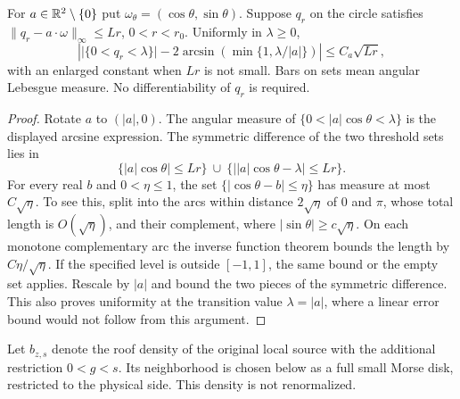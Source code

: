 \begin{lemma}
\label{lem:v65-angular-threshold}
For $a\in\mathbb R^2\setminus\{0\}$ put $\omega_\theta=(\cos\theta,\sin\theta)$.
Suppose $q_r$ on the circle satisfies
$\|q_r-a\cdot\omega\|_\infty\le Lr$, $0<r<r_0$.
Uniformly in $\lambda\ge0$,
\begin{equation}\label{eq:v65-angular-threshold}
 \left|\bigl|\{0<q_r<\lambda\}\bigr|
       -2\arcsin\!\left(\min\{1,\lambda/|a|\}\right)\right|
       \le C_a\sqrt{Lr},
\end{equation}
with an enlarged constant when $Lr$ is not small. Bars on sets mean
angular Lebesgue measure. No differentiability of $q_r$ is required.
\end{lemma}
\begin{proof}
Rotate $a$ to $(|a|,0)$. The angular measure of
$\{0<|a|\cos\theta<\lambda\}$ is the displayed arcsine expression.
The symmetric difference of the two threshold sets lies in
\[
 \{|a|\cos\theta|\le Lr\}\ \cup\
 \{\bigl||a|\cos\theta-\lambda\bigr|\le Lr\}.
\]
For every real $b$ and $0<\eta\le1$, the set
$\{|\cos\theta-b|\le\eta\}$ has measure at most $C\sqrt\eta$.
To see this, split into the arcs within distance $2\sqrt\eta$ of
$0$ and $\pi$, whose total length is $O(\sqrt\eta)$, and their
complement, where $|\sin\theta|\ge c\sqrt\eta$. On each monotone
complementary arc the inverse function theorem bounds the length by
$C\eta/\sqrt\eta$. If the specified level is outside $[-1,1]$,
the same bound or the empty set applies. Rescale by $|a|$ and bound
the two pieces of the symmetric difference. This also proves uniformity
at the transition value $\lambda=|a|$, where a linear error bound
would not follow from this argument.
\end{proof}

Let $b_{z,s}$ denote the roof density of the original local source
with the additional restriction $0<g<s$. Its neighborhood is chosen
below as a full small Morse disk, restricted to the physical side.
This density is not renormalized.

